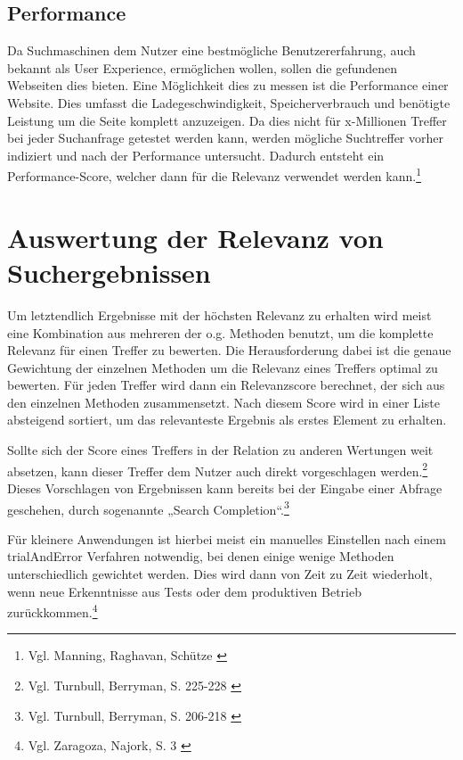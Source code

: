 \subsection{Performance}
\label{sub:relevancePerformance}
Da Suchmaschinen dem Nutzer eine bestmögliche Benutzererfahrung, auch bekannt als User Experience, ermöglichen wollen, sollen die gefundenen Webseiten dies bieten. Eine Möglichkeit dies zu messen ist die Performance einer Website.
Dies umfasst die Ladegeschwindigkeit, Speicherverbrauch und benötigte Leistung um die Seite komplett anzuzeigen.
Da dies nicht für x-Millionen Treffer bei jeder Suchanfrage getestet werden kann, werden mögliche Suchtreffer vorher indiziert und nach der Performance untersucht.
Dadurch entsteht ein Performance-Score, welcher dann für die Relevanz verwendet werden kann.\footnote{Vgl. Manning, Raghavan, Schütze \cite{manning2008}}

\section{Auswertung der Relevanz von Suchergebnissen}
\label{sec:relevanceScore}
Um letztendlich Ergebnisse mit der höchsten Relevanz zu erhalten wird meist eine Kombination aus mehreren der o.g. Methoden benutzt, um die komplette Relevanz für einen Treffer zu bewerten.
Die Herausforderung dabei ist die genaue Gewichtung der einzelnen Methoden um die Relevanz eines Treffers optimal zu bewerten.
Für jeden Treffer wird dann ein Relevanzscore berechnet, der sich aus den einzelnen Methoden zusammensetzt. Nach diesem Score wird in einer Liste absteigend sortiert, um das relevanteste Ergebnis als erstes Element zu erhalten.

Sollte sich der Score eines Treffers in der Relation zu anderen Wertungen weit absetzen, kann dieser Treffer dem Nutzer auch direkt vorgeschlagen werden.\footnote{Vgl. Turnbull, Berryman, S. 225-228 \cite{turnbull2016}} Dieses Vorschlagen von Ergebnissen kann bereits bei der Eingabe einer Abfrage geschehen, durch sogenannte „Search Completion“.\footnote{Vgl. Turnbull, Berryman, S. 206-218 \cite{turnbull2016}}

Für kleinere Anwendungen ist hierbei meist ein manuelles Einstellen nach einem \gls{trialAndError} Verfahren notwendig, bei denen einige wenige Methoden unterschiedlich gewichtet werden.
Dies wird dann von Zeit zu Zeit wiederholt, wenn neue Erkenntnisse aus Tests oder dem produktiven Betrieb zurückkommen.\footnote{Vgl. Zaragoza, Najork, S. 3 \cite{zaragoza2018}}

